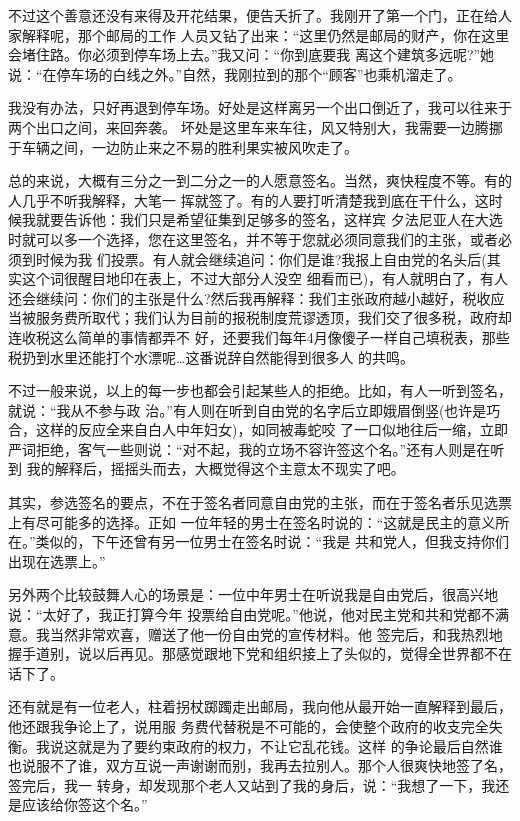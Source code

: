 ﻿\documentclass[11pt]{article}
\begin{document}
不过这个善意还没有来得及开花结果，便告夭折了。我刚开了第一个门，正在给人家解释呢，那个邮局的工作
人员又钻了出来：``这里仍然是邮局的财产，你在这里会堵住路。你必须到停车场上去。''我又问：``你到底要我
离这个建筑多远呢?''她说：``在停车场的白线之外。''自然，我刚拉到的那个``顾客''也乘机溜走了。

我没有办法，只好再退到停车场。好处是这样离另一个出口倒近了，我可以往来于两个出口之间，来回奔袭。
坏处是这里车来车往，风又特别大，我需要一边腾挪于车辆之间，一边防止来之不易的胜利果实被风吹走了。

总的来说，大概有三分之一到二分之一的人愿意签名。当然，爽快程度不等。有的人几乎不听我解释，大笔一
挥就签了。有的人要打听清楚我到底在干什么，这时候我就要告诉他：我们只是希望征集到足够多的签名，这样宾
夕法尼亚人在大选时就可以多一个选择，您在这里签名，并不等于您就必须同意我们的主张，或者必须到时候为我
们投票。有人就会继续追问：你们是谁?我报上自由党的名头后(其实这个词很醒目地印在表上，不过大部分人没空
细看而已)，有人就明白了，有人还会继续问：你们的主张是什么?然后我再解释：我们主张政府越小越好，税收应
当被服务费所取代；我们认为目前的报税制度荒谬透顶，我们交了很多税，政府却连收税这么简单的事情都弄不
好，还要我们每年4月像傻子一样自己填税表，那些税扔到水里还能打个水漂呢\ldots 这番说辞自然能得到很多人
的共鸣。

不过一般来说，以上的每一步也都会引起某些人的拒绝。比如，有人一听到签名，就说：``我从不参与政
治。''有人则在听到自由党的名字后立即娥眉倒竖(也许是巧合，这样的反应全来自白人中年妇女)，如同被毒蛇咬
了一口似地往后一缩，立即严词拒绝，客气一些则说：``对不起，我的立场不容许签这个名。''还有人则是在听到
我的解释后，摇摇头而去，大概觉得这个主意太不现实了吧。

其实，参选签名的要点，不在于签名者同意自由党的主张，而在于签名者乐见选票上有尽可能多的选择。正如
一位年轻的男士在签名时说的：``这就是民主的意义所在。''类似的，下午还曾有另一位男士在签名时说：``我是
共和党人，但我支持你们出现在选票上。''

另外两个比较鼓舞人心的场景是：一位中年男士在听说我是自由党后，很高兴地说：``太好了，我正打算今年
投票给自由党呢。''他说，他对民主党和共和党都不满意。我当然非常欢喜，赠送了他一份自由党的宣传材料。他
签完后，和我热烈地握手道别，说以后再见。那感觉跟地下党和组织接上了头似的，觉得全世界都不在话下了。

还有就是有一位老人，柱着拐杖踯躅走出邮局，我向他从最开始一直解释到最后，他还跟我争论上了，说用服
务费代替税是不可能的，会使整个政府的收支完全失衡。我说这就是为了要约束政府的权力，不让它乱花钱。这样
的争论最后自然谁也说服不了谁，双方互说一声谢谢而别，我再去拉别人。那个人很爽快地签了名，签完后，我一
转身，却发现那个老人又站到了我的身后，说：``我想了一下，我还是应该给你签这个名。''
\end{document}
